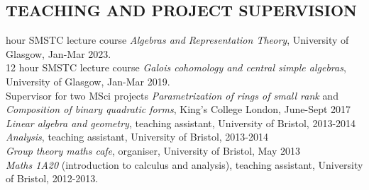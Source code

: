 \documentclass{res}
\begin{document}
\begin{resume}
%
%

\section{TEACHING AND PROJECT SUPERVISION}       

 hour SMSTC lecture course {\it Algebras and Representation Theory}, University of Glasgow, Jan-Mar 2023.\medskip\\
12 hour SMSTC lecture course {\it Galois cohomology and central simple algebras}, University of Glasgow, Jan-Mar 2019.\medskip\\
Supervisor for two MSci projects {\it Parametrization of rings of small rank} 
\textup{and} {\it Composition of binary quadratic forms}\textup{, King's College London, June-Sept 2017} \medskip\\   
    {\it Linear algebra and geometry}, teaching assistant, University of Bristol, 2013-2014 \medskip\\         
    {\it Analysis}, teaching assistant, University of Bristol, 2013-2014 \medskip \\
{\it Group theory maths cafe}, organiser, University of Bristol, May 2013 \medskip \\
    {\it Maths 1A20} (introduction to calculus and analysis), teaching assistant, University of Bristol, 2012-2013. 
 


\end{resume}
\end{document}
